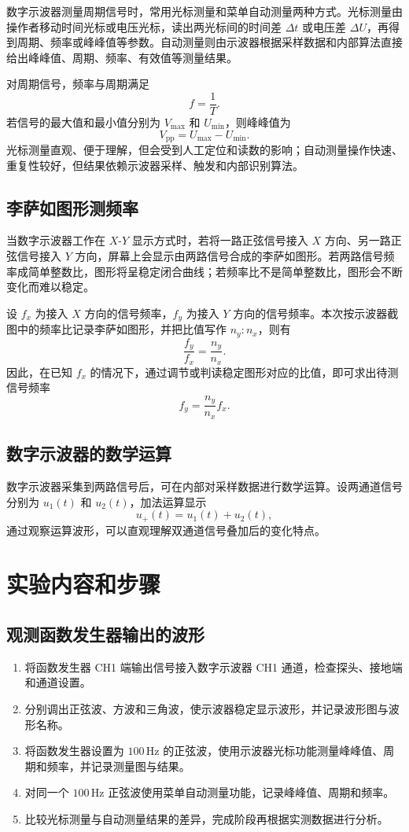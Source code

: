 \documentclass{../template/myrpt}
\begin{document}
数字示波器测量周期信号时，常用光标测量和菜单自动测量两种方式。光标测量由操作者移动时间光标或电压光标，读出两光标间的时间差 $\Delta t$ 或电压差 $\Delta U$，再得到周期、频率或峰峰值等参数。自动测量则由示波器根据采样数据和内部算法直接给出峰峰值、周期、频率、有效值等测量结果。

对周期信号，频率与周期满足
\[
  f = \frac{1}{T}.
\]
若信号的最大值和最小值分别为 $V_{\max}$ 和 $U_{\min}$，则峰峰值为
\[
  V_{\mathrm{pp}} = U_{\max} - U_{\min}.
\]
光标测量直观、便于理解，但会受到人工定位和读数的影响；自动测量操作快速、重复性较好，但结果依赖示波器采样、触发和内部识别算法。

\subsection{李萨如图形测频率}

当数字示波器工作在 $X$-$Y$ 显示方式时，若将一路正弦信号接入 $X$ 方向、另一路正弦信号接入 $Y$ 方向，屏幕上会显示由两路信号合成的李萨如图形。若两路信号频率成简单整数比，图形将呈稳定闭合曲线；若频率比不是简单整数比，图形会不断变化而难以稳定。

设 $f_x$ 为接入 $X$ 方向的信号频率，$f_y$ 为接入 $Y$ 方向的信号频率。本次按示波器截图中的频率比记录李萨如图形，并把比值写作 $n_y:n_x$，则有
\[
  \frac{f_y}{f_x} = \frac{n_y}{n_x}.
\]
因此，在已知 $f_x$ 的情况下，通过调节或判读稳定图形对应的比值，即可求出待测信号频率
\[
  f_y = \frac{n_y}{n_x} f_x.
\]

\subsection{数字示波器的数学运算}

数字示波器采集到两路信号后，可在内部对采样数据进行数学运算。设两通道信号分别为 $u_1(t)$ 和 $u_2(t)$，加法运算显示
\[
  u_+(t)=u_1(t)+u_2(t),
\]
通过观察运算波形，可以直观理解双通道信号叠加后的变化特点。

\section{实验内容和步骤}

\subsection{观测函数发生器输出的波形}

\begin{enumerate}[label=\arabic*)]
  \item 将函数发生器 CH1 端输出信号接入数字示波器 CH1 通道，检查探头、接地端和通道设置。
  \item 分别调出正弦波、方波和三角波，使示波器稳定显示波形，并记录波形图与波形名称。
  \item 将函数发生器设置为 $100\,\si{\hertz}$ 的正弦波，使用示波器光标功能测量峰峰值、周期和频率，并记录测量图与结果。
  \item 对同一个 $100\,\si{\hertz}$ 正弦波使用菜单自动测量功能，记录峰峰值、周期和频率。
  \item 比较光标测量与自动测量结果的差异，完成阶段再根据实测数据进行分析。
\end{enumerate}
\end{document}
